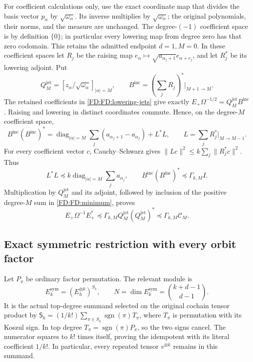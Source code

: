 For coefficient calculations only, use the exact coordinate map that
divides the basis vector \(p_\alpha\) by \(\sqrt{\omega_\alpha}\).
Its inverse multiplies by \(\sqrt{\omega_\alpha}\); the original
polynomials, their norms, and the measure are unchanged.
The degree-\((-1)\) coefficient space is by definition \(\{0\}\);
in particular every lowering map from degree zero has that zero
codomain.  This retains the admitted endpoint \(d=1,M=0\).
In these coefficient spaces let \(R_j\) be the raising map
\(e_\alpha\mapsto\sqrt{a_{\alpha_j+1}}e_{\alpha+e_j}\), and let
\(R_j^*\) be its lowering adjoint.  Put
\[
Q_M^{\mathrm{jet}}=[z_\alpha/\sqrt{\omega_\alpha}]_{|\alpha|=M},
\qquad B^{\mathrm{inc}}=(\textstyle\sum_jR_j)^*\big|_{M+1\to M}.
\]
The retained coefficients in \eqref{FD:FD:lowering-jets} give exactly
\(E_+\Omega^{-1/2}=Q_M^{\mathrm{jet}}B^{\mathrm{inc}}\).
Raising and lowering in distinct coordinates commute.  Hence, on the
degree-\(M\) coefficient space,
\[
B^{\mathrm{inc}}(B^{\mathrm{inc}})^*
=\operatorname{diag}_{|\alpha|=M}\sum_j
(a_{\alpha_j+1}-a_{\alpha_j})+L^*L,
\qquad L=\textstyle\sum_j R_j^*\big|_{M\to M-1}.
\]
For every coefficient vector \(c\), Cauchy--Schwarz gives
\(\|Lc\|^2\le k\sum_j\|R_j^*c\|^2\).  Thus
\[
L^*L\preceq k\operatorname{diag}_{|\alpha|=M}\sum_ja_{\alpha_j},
\qquad
B^{\mathrm{inc}}(B^{\mathrm{inc}})^*\preceq\Gamma_{k,M}I.
\]
Multiplication by \(Q_M^{\mathrm{jet}}\) and its adjoint, followed by
inclusion of the positive degree-\(M\) sum in \eqref{FD:FD:minimum}, proves
\begin{equation}
E_+\Omega^{-1}E_+^*\preceq
\Gamma_{k,M}Q_M^{\mathrm{jet}}(Q_M^{\mathrm{jet}})^*
\preceq\Gamma_{k,M}\mathcal C_M.
\tag{FD.21}\label{FD:FD:lowering-bound}
\end{equation}

\subsection{Exact symmetric restriction with every orbit factor}

Let \(P_\pi\) be ordinary factor permutation.  The relevant module is
\[
E_k^{\mathrm{sym}}=(E_h^{\otimes k})^{S_k},\qquad
N=\dim E_k^{\mathrm{sym}}=\binom{k+d-1}{d-1}.
\]
It is the actual top-degree summand selected on the original cochain
tensor product by
\(\mathsf S_k=(1/k!)\sum_{\pi\in S_k}\operatorname{sgn}(\pi)T_\pi\),
where \(T_\pi\) is permutation with its Koszul sign.
In top degree \(T_\pi=\operatorname{sgn}(\pi)P_\pi\), so the two signs
cancel.  The numerator squares to \(k!\) times itself, proving the
idempotent with its literal coefficient \(1/k!\).  In particular,
every repeated tensor \(v^{\otimes k}\) remains in this summand.

